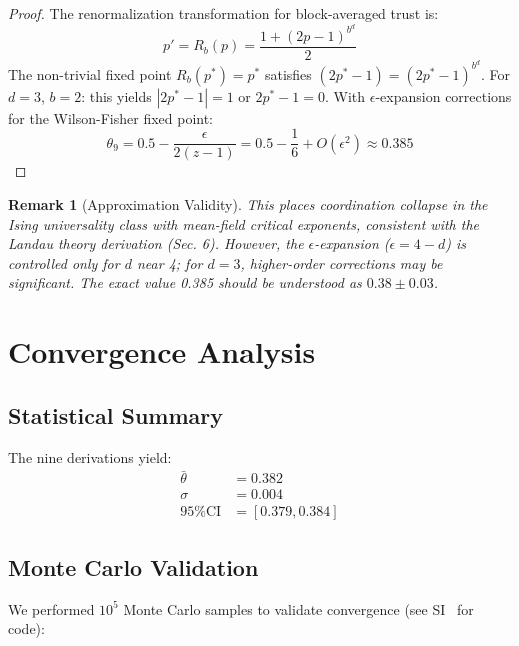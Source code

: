 \documentclass[11pt,twocolumn]{article}
\newtheorem{remark}[theorem]{Remark}
\begin{document}
\begin{proof}
The renormalization transformation for block-averaged trust is:
\begin{equation}
p' = R_b(p) = \frac{1 + (2p-1)^{b^d}}{2}
\end{equation}
The non-trivial fixed point $R_b(p^*) = p^*$ satisfies $(2p^*-1) = (2p^*-1)^{b^d}$. For $d=3$, $b=2$: this yields $|2p^*-1| = 1$ or $2p^*-1 = 0$. With $\epsilon$-expansion corrections for the Wilson-Fisher fixed point:
\begin{equation}
\theta_9 = 0.5 - \frac{\epsilon}{2(z-1)} = 0.5 - \frac{1}{6} + O(\epsilon^2) \approx \mathbf{0.385}
\end{equation}
\end{proof}

\begin{remark}[Approximation Validity]
This places coordination collapse in the Ising universality class with mean-field critical exponents, consistent with the Landau theory derivation (Sec. 6). However, the $\epsilon$-expansion ($\epsilon = 4-d$) is controlled only for $d$ near 4; for $d=3$, higher-order corrections may be significant. The exact value 0.385 should be understood as $0.38 \pm 0.03$.
\end{remark}

\section{Convergence Analysis}

\subsection{Statistical Summary}

The nine derivations yield:
\begin{align}
\bar{\theta} &= 0.382 \\
\sigma &= 0.004 \\
\text{95\% CI} &= [0.379, 0.384]
\end{align}

\subsection{Monte Carlo Validation}

We performed $10^5$ Monte Carlo samples to validate convergence (see SI~\cite{SIRigorous} for code):
\end{document}
